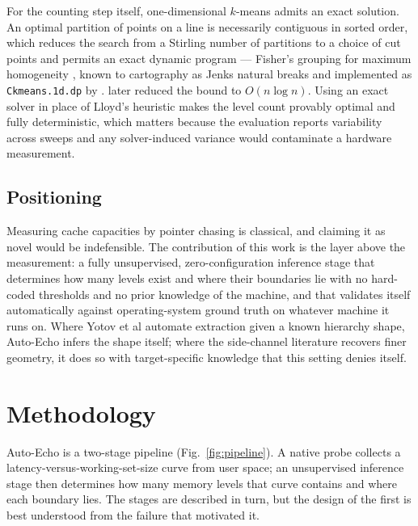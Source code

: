 \documentclass[conference]{IEEEtran}
\begin{document}
For the counting step itself, one-dimensional $k$-means admits an exact solution.
An optimal partition of points on a line is necessarily contiguous in sorted
order, which reduces the search from a Stirling number of partitions to a choice
of cut points and permits an exact dynamic program --- Fisher's grouping for
maximum homogeneity \citep{fisher1958}, known to cartography as Jenks natural
breaks and implemented as \texttt{Ckmeans.1d.dp} by \citet{wang2011}. \citet{gronlund2017} later reduced the bound
to $O(n \log n)$. Using an exact solver in place of Lloyd's heuristic
\citep{lloyd1982} makes the level count provably optimal and fully deterministic,
which matters because the evaluation reports variability across sweeps and any
solver-induced variance would contaminate a hardware measurement.

\subsection{Positioning}

Measuring cache capacities by pointer chasing is classical, and claiming it as
novel would be indefensible. The contribution of this work is the layer above the
measurement: a fully unsupervised, zero-configuration inference stage that
determines how many levels exist and where their boundaries lie with no
hard-coded thresholds and no prior knowledge of the machine, and that validates
itself automatically against operating-system ground truth on whatever machine it
runs on. Where Yotov et al automate extraction given a known hierarchy shape,
Auto-Echo infers the shape itself; where the side-channel literature recovers
finer geometry, it does so with target-specific knowledge that this setting
denies itself.

\section{Methodology}
\label{sec:method}

Auto-Echo is a two-stage pipeline (Fig.~\ref{fig:pipeline}). A native probe
collects a latency-versus-working-set-size curve from user space; an unsupervised
inference stage then determines how many memory levels that curve contains and
where each boundary lies. The stages are described in turn, but the design of the
first is best understood from the failure that motivated it.
\end{document}
